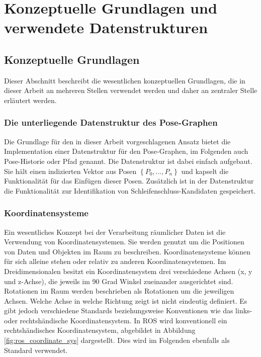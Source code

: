 \chapter{Konzeptuelle Grundlagen und verwendete Datenstrukturen}
\label{chapter:grundlagen}

\section{Konzeptuelle Grundlagen}

Dieser Abschnitt beschreibt die wesentlichen konzeptuellen Grundlagen, die in dieser Arbeit an mehreren Stellen verwendet werden und daher an zentraler Stelle erläutert werden.

\subsection{Die unterliegende Datenstruktur des Pose-Graphen}

Die Grundlage für den in dieser Arbeit vorgeschlagenen Ansatz bietet die Implementation einer Datenstruktur für den Pose-Graphen, im Folgenden auch Pose-Historie oder Pfad genannt. Die Datenstruktur ist dabei einfach aufgebaut. Sie hält einen indizierten Vektor aus Posen $\left\lbrace P_0, ..., P_n \right\rbrace$ und kapselt die Funktionalität für das Einfügen dieser Posen. Zusätzlich ist in der Datenstruktur die Funktionalität zur Identifikation von Schleifenschluss-Kandidaten gespeichert.

\subsection{Koordinatensysteme}

Ein wesentliches Konzept bei der Verarbeitung räumlicher Daten ist die Verwendung von Koordinatensystemen.
Sie werden genutzt um die Positionen von Daten und Objekten im Raum zu beschreiben.
Koordinatensysteme können für sich alleine stehen oder relativ zu anderen Koordinatensystemen.
Im Dreidimensionalen besitzt ein Koordinatensystem drei verschiedene Achsen (x, y und z-Achse), die jeweils im 90 Grad Winkel zueinander ausgerichtet sind.
Rotationen im Raum werden beschrieben als Rotationen um die jeweiligen Achsen.
Welche Achse in welche Richtung zeigt ist nicht eindeutig definiert.
Es gibt jedoch verschiedene Standards beziehungsweise Konventionen wie das links- oder rechtshändische Koordinatensystem.
In ROS wird konventionell ein rechtshändisches Koordinatensystem, abgebildet in Abbildung \ref{fig:ros_coordinate_sys} dargestellt. Dies wird im Folgenden ebenfalls als Standard verwendet.

